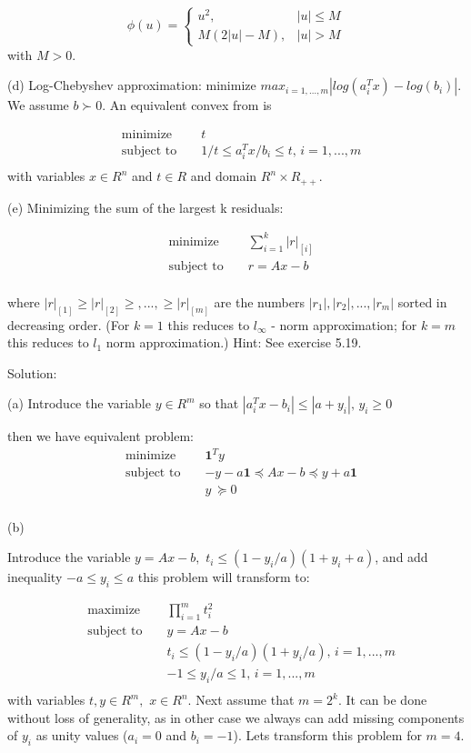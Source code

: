 \documentclass{article}
\begin{document}
$$
\phi(u) = 
\begin{cases}
u^2, & |u| \leq M \\
M(2|u| - M), & |u| > M
\end{cases}
$$
with $M > 0.$

(d) Log-Chebyshev approximation: minimize
$max_{i = 1, ..., m} 
|log(a_i^T x) - log(b_i)|.$ We assume 
$b \succ 0.$ An equivalent convex from is

\begin{align*}
&\text{minimize } && t \\
&\text{subject to } 
&& 1/t \leq a_i^Tx/b_i \leq t, \, i = 1 ,..., m\\
\end{align*} 
with variables $x \in R^n$ and $t \in R$ and domain $R^n \times R_{++}.$

(e) Minimizing the sum of the largest k residuals:

\begin{align*}
&\text{minimize } && 
\sum_{i = 1}^k |r|_{[i]} \\
&\text{subject to } 
&& r = Ax - b\\
\end{align*} 

where $|r|_{[1]} \geq |r|_{[2]} \geq ,..., 
\geq |r|_{[m]}$ are the numbers 
$|r_1|, |r_2|, ... , |r_m| $ sorted in decreasing order. (For $k = 1$ this reduces to $l_\infty$ - norm approximation; for $k = m$ this reduces to $l_1$ norm approximation.) Hint: See exercise 5.19.

Solution:

(a) Introduce the variable $y \in R^m$ so that 
$|a_i^T x - b_i| \leq |a + y_i|, \, y_i \geq 0$

then we have equivalent problem:
\begin{align*}
&\text{minimize } && \boldsymbol{1}^Ty \\
&\text{subject to } 
&& - y - a \boldsymbol{1} \preceq A x - b 
\preceq y + a \boldsymbol{1} \\
& && y \ \succeq 0\\
\end{align*}

(b)

Introduce the variable $y = Ax - b, $ 
$t_i \leq (1 - y_i / a)(1 + y_i + a)$, and add inequality $-a \leq y_i \leq a$ this problem will transform to:

\begin{align*}
&\text{maximize } && \prod_{i = 1}^m t_i^2 \\
&\text{subject to } && y = A x - b \\
& && t_i \leq (1 - y_i / a)(1 + y_i / a),
\, i = 1, ..., m\\
& && -1 \leq y_i / a \leq 1, \, i = 1, ..., m\\
\end{align*}
with variables $t, y \in R^m,$ $x \in R^n.$
Next assume that $m = 2^k.$ It can be done without loss of generality, as in other case we always can add missing components of $y_i$ as unity values ($a_i = 0$ and 
$b_i = - 1$). Lets transform this problem for $m = 4.$
\end{document}

